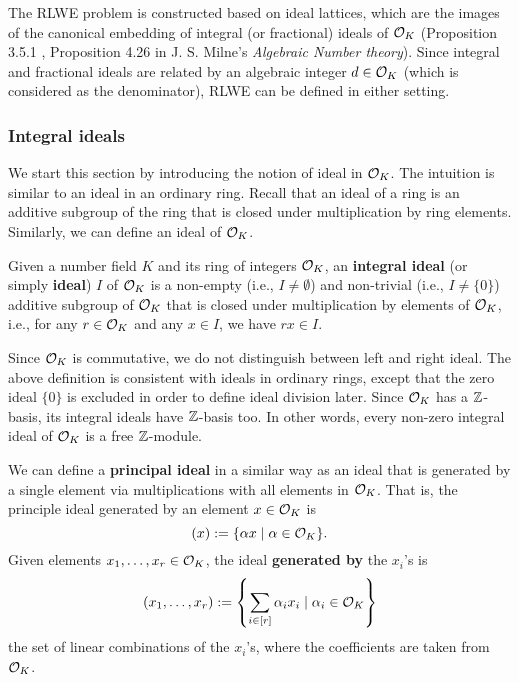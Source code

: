 \documentclass[../main.tex]{subfiles}
\begin{document}
The RLWE problem is constructed based on ideal lattices, which are the images of the canonical embedding of integral (or fractional) ideals of $\mathcal{O}_K$ (Proposition 3.5.1 \cite{mukherjee2016cyclotomic}, Proposition 4.26 in J. S. Milne's \textit{Algebraic Number theory}). 
Since integral and fractional ideals are related by an algebraic integer $d \in \mathcal{O}_K$ (which is considered as the denominator), RLWE can be defined in either setting. 
	

\subsubsection{Integral ideals}

We start this section by introducing the notion of ideal in $\mathcal{O}_K$. The intuition is similar to an ideal in an ordinary ring. Recall that an ideal of a ring is an additive subgroup of the ring that is closed under multiplication by ring elements. Similarly, we can define an ideal of $\mathcal{O}_K$. 
	
\begin{definition}
Given a number field $K$ and its ring of integers $\mathcal{O}_K$, an 
\reversemarginpar
{}
\textbf{integral ideal} (or simply \textbf{ideal}) $I$ of $\mathcal{O}_K$ is a non-empty (i.e., $I \neq \emptyset$) and non-trivial (i.e., $I \neq \{0\}$) additive subgroup of $\mathcal{O}_K$ that is closed under multiplication by elements of $\mathcal{O}_K$, i.e., for any $r \in \mathcal{O}_K$ and any $x \in I$, we have $rx \in I$. 
\end{definition}

Since $\mathcal{O}_K$ is commutative, we do not distinguish between left and right ideal. The above definition is consistent with ideals in ordinary rings, except that the zero ideal $\{0\}$ is excluded in order to define ideal division later. Since $\mathcal{O}_K$ has a $\mathbb{Z}$-basis, its integral ideals have $\mathbb{Z}$-basis too. In other words, every non-zero integral ideal of $\mathcal{O}_K$ is a free $\mathbb{Z}$-module. 
	
We can define a 
\reversemarginpar
{}
\textbf{principal ideal} in a similar way as an ideal that is generated by a single element via multiplications with all elements in $\mathcal{O}_K$. That is, the principle ideal generated by an element $x \in \mathcal{O}_K$ is 
\begin{equation*}
    (x) := \{\alpha x \mid \alpha \in \mathcal{O}_K\}.
\end{equation*}
Given elements $x_1, \dots, x_r \in \mathcal{O}_K$, the ideal \textbf{generated by} the $x_i$'s is 
\begin{equation*}
    (x_1,\dots, x_r) := \left\{\sum_{i \in [r]} \alpha_i x_i \mid \alpha_i \in \mathcal{O}_K\right\}
\end{equation*} 
the set of linear combinations of the $x_i$'s, where the coefficients are taken from $\mathcal{O}_K$.
	
\end{document}
